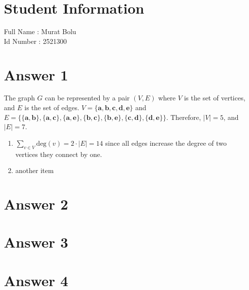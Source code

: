 \documentclass[12pt]{article}
\begin{document}
\section*{Student Information } 
Full Name : Murat Bolu \\
Id Number : 2521300 \\

\section*{Answer 1}
The graph $G$ can be represented by a pair $(V, E)$ where $V$ is the set of vertices, and $E$ is the set of edges.
$V = \{\textbf{a}, \textbf{b}, \textbf{c}, \textbf{d}, \textbf{e}\}$ and $E = \{\{\textbf{a}, \textbf{b}\}, \{\textbf{a}, \textbf{c}\}, \{\textbf{a}, \textbf{e}\}, \{\textbf{b}, \textbf{c}\}, \{\textbf{b}, \textbf{e}\}, \{\textbf{c}, \textbf{d}\}, \{\textbf{d}, \textbf{e}\}\}$.
Therefore, $|V| = 5$, and $|E| = 7$.
\begin{enumerate}
    \item $\displaystyle\sum_{v \in V} \text{deg}(v) = 2 \cdot |E| = 14$ since all edges increase the degree of two vertices they connect by one.
    \item another item
\end{enumerate}

\section*{Answer 2}


\section*{Answer 3}


\section*{Answer 4}
\end{document}
